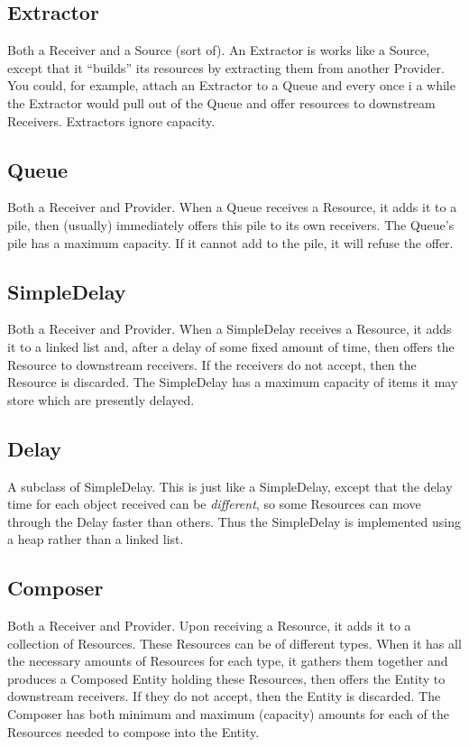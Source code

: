\documentclass[twoside,10pt]{article}
\begin{document}
\begin{itemize}
\subsection{Extractor}

Both a Receiver and a Source (sort of).  An Extractor is works like a Source, except that it ``builds'' its resources by extracting them from another Provider.  You could, for example, attach an Extractor to a Queue and every once i a while the Extractor would pull out of the Queue and offer resources to downstream Receivers.  Extractors ignore capacity.

\subsection{Queue}

Both a Receiver and Provider.  When a Queue receives a Resource, it adds it to a pile, then (usually) immediately offers this pile to its own receivers.  The Queue's pile has a maximum capacity.  If it cannot add to the pile, it will refuse the offer.

\subsection{SimpleDelay}

Both a Receiver and Provider.  When a SimpleDelay receives a Resource, it adds it to a linked list and, after a delay of some fixed amount of time, then offers the Resource to downstream receivers.  If the receivers do not accept, then the Resource is discarded.  The SimpleDelay has a maximum capacity of items it may store which are presently delayed.

\subsection{Delay}

A subclass of SimpleDelay.  This is just like a SimpleDelay, except that the delay time for each object received can be {\it different}, so some Resources can move through the Delay faster than others.  Thus the SimpleDelay is implemented using a heap rather than a linked list.

\subsection{Composer}

Both a Receiver and Provider.  Upon receiving a Resource, it adds it to a collection of Resources. These Resources can be of different types.  When it has all the necessary amounts of Resources for each type, it gathers them together and produces a Composed Entity holding these Resources, then offers the Entity to downstream receivers. If they do not accept, then the Entity is discarded.  The Composer has both minimum and maximum (capacity) amounts for each of the Resources needed to compose into the Entity.


\end{itemize}
\end{document}
